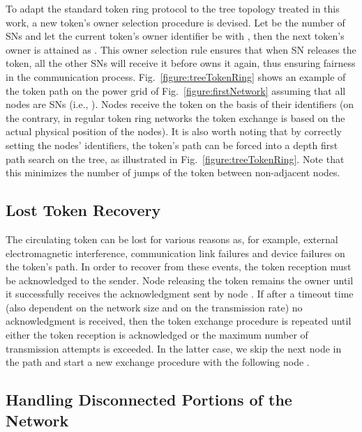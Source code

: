 \documentclass[journal]{IEEEtran}
\newcommand{\fig}[1]{Fig.~\ref{#1}}
\begin{document}
To adapt the standard token ring protocol to the tree topology treated in this work, a new token's owner selection procedure is devised. Let  be the number of SNs and let the current token's owner identifier be  with , then the next token's owner is attained as . This owner selection rule ensures that when SN  releases the token, all the other SNs will receive it before  owns it again, thus ensuring fairness in the communication process. \fig{figure:treeTokenRing} shows an example of the token path on the power grid of \fig{figure:firstNetwork} assuming that all nodes are SNs (i.e., ). Nodes receive the token on the basis of their identifiers (on the contrary, in regular token ring networks the token exchange is based on the actual physical position of the nodes). It is also worth noting that by correctly setting the nodes' identifiers, the token's path can be forced into a depth first path search on the tree, as illustrated in \fig{figure:treeTokenRing}. Note that this minimizes the number of jumps of the token between non-adjacent nodes.

\subsection{Lost Token Recovery}

The circulating token can be lost for various reasons as, for example, external electromagnetic interference, communication link failures and device failures on the token's path. In order to recover from these events, the token reception must be acknowledged to the sender. Node  releasing the token remains the owner until it successfully receives the acknowledgment sent by node . If after a timeout time  (also dependent on the network size and on the transmission rate) no acknowledgment is received, then the token exchange procedure is repeated until either the token reception is acknowledged or the maximum number of transmission attempts is exceeded. In the latter case, we skip the next node in the path and start a new exchange procedure with the following node .

\subsection{Handling Disconnected Portions of the Network}
\end{document}
